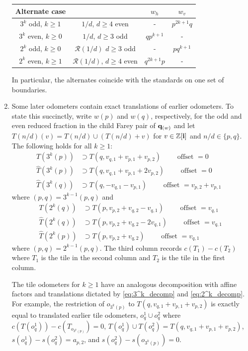 \documentclass[12pt]{amsart}
\begin{document}
\begin{prop}
\begin{enumerate}[label=(\alph*)]
\begin{center}
\begin{tabular}{ c  c|c c }
			Alternate case &  &$w_h$ &  $w_v$ \\ 
			\hline
			$3^k$ odd, $k \geq 1$  & $1/d$, $d \geq 4$ even & - &$p^{2k+1}q$  \\ 
			$3^k$ even, $k \geq 0$ & $1/d$, $d \geq 3$ odd & $qp^{k+1}$ & - \\ 
			$2^k$ odd,  $k \geq 0$& $\mathcal{R}(1/d)$ $d \geq 3$ odd & - & $pq^{k+1}$ \\ 
			$2^k$ even, $k \geq 1$ &  $\mathcal{R}(1/d)$, $d \geq 4$ even  & $q^{2k+1}p$ & - 
		\end{tabular}
	\end{center}
	In particular, the alternates coincide with the standards on one set of boundaries. 
	\item  Some later odometers contain exact translations of earlier odometers. To state this succinctly, 
	write $w(p)$ and $w(q)$, respectively, for the odd and even reduced fraction in the child Farey pair of $\mathbf{q}_{(w)}$
	and let $T(n/d)(v) = T(n/d) \cup (T(n/d) + v)$ for $v \in \mathbb{Z}[\mathbf{i}]$ and $n/d \in \{p,q\}$. 
	The following holds for all $k \geq 1$: 
	\begin{equation} \label{eq:3^k_decomp}
	\begin{aligned}
	 T(3^{k}(p)) &\supset T(q, v_{q,1} + v_{p,1} + v_{p,2}) \qquad \mbox{ offset $=0$} \\
	 \hat{T}(3^{k}(p))	 &\supset T(q, v_{q,1} + v_{p,1} + 2 v_{p,2}) \qquad \mbox{ offset $=0$ }  \\
	 \hat{T}(3^{k}(q)) &\supset T(q, -v_{q,1} - v_{p,1} ) \qquad \mbox{ offset $=v_{p,2} +v_{p,1}$ } 
	 \end{aligned}
	 \end{equation}
	 where $(p,q) = 3^{k-1}(p,q)$ and
	 \begin{equation} \label{eq:2^k_decomp}
	 \begin{aligned}
	 T(2^{k}(q)) &\supset T(p, v_{p,2} + v_{q,2} - v_{q,1}) \qquad \mbox{ offset $=v_{q,1}$ } \\
	 \hat{T}(2^{k}(q)) &\supset T(p, v_{p,2} + v_{q,2} - 2 v_{q,1}) \qquad \mbox{ offset $=v_{q,1}$}\\
	 	\hat{T}(2^{k}(p)) &\supset T(p, v_{p,2} + v_{q,2}) \qquad \mbox{ offset $=v_{q,1}$ }
	 	\end{aligned}
	 \end{equation}
	 where $(p,q) = 2^{k-1}(p,q)$. The third column records $c(T_1) - c(T_2)$ where $T_1$ is the tile in the second column
	 and $T_2$ is the tile in the first column. 
	
The tile odometers for $k \geq 1$ have an analogous decomposition with affine factors and translations dictated by \eqref{eq:3^k_decomp} and \eqref{eq:2^k_decomp}. For example, the restriction of $o_{3^{k}(p)}$ to $T(q, v_{q,1} + v_{p,1} + v_{p,2})$
is exactly equal to translated earlier tile odometers, $o_{q}^1 \cup o_{q}^2$ where $c(T(o_{q}^1)) - c(T_{o_{3^{k}(p)}}) = 0$, 
	 $T(o_{q}^1) \cup T(o_{q}^2) = T(q, v_{q,1} + v_{p,1} + v_{p,2})$,  $s(o_{q}^1) - s(o_{q}^2) = a_{p,2}$, and $s(o_{q}^2) - s(o_{3^{k}(p)}) = 0$. 
	 

\end{enumerate}
\end{prop}
\end{document}
